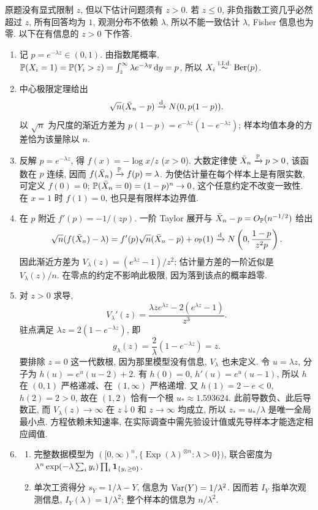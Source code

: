 \begin{solution}
原题没有显式限制 $z$, 但以下估计问题须有 $z>0$. 若 $z\le0$, 非负指数工资几乎必然超过 $z$, 所有回答均为 $1$, 观测分布不依赖 $\lambda$, 所以不能一致估计 $\lambda$, Fisher 信息也为零. 以下在有信息的 $z>0$ 下作答.
\begin{enumerate}[label=\arabic*.]
\item 记 $p=e^{-\lambda z}\in(0,1)$. 由指数尾概率,
$\mathbb P(X_i=1)=\mathbb P(Y_i>z)=\int_z^\infty\lambda e^{-\lambda y}\,\mathrm d y=p$,
所以 $X_i\stackrel{\mathrm{i.i.d.}}{\sim}\operatorname{Ber}(p)$.
\item 中心极限定理给出
\[
\sqrt n(\bar X_n-p)\xrightarrow{\mathrm d} N(0,p(1-p)).
\]
以 $\sqrt n$ 为尺度的渐近方差为 $p(1-p)=e^{-\lambda z}(1-e^{-\lambda z})$; 样本均值本身的方差恰为该量除以 $n$.
\item 反解 $p=e^{-\lambda z}$, 得 $f(x)=-\log x/z$ ($x>0$). 大数定律使 $\bar X_n\xrightarrow{\mathbb P} p>0$, 该函数在 $p$ 连续, 因而 $f(\bar X_n)\xrightarrow{\mathbb P} f(p)=\lambda$. 为使估计量在每个样本上是有限实数, 可定义 $f(0)=0$; $\mathbb P(\bar X_n=0)=(1-p)^n\to0$, 这个任意约定不改变一致性. 在 $x=1$ 时 $f(1)=0$, 也只是有限样本边界值.
\item 在 $p$ 附近 $f'(p)=-1/(zp)$. 一阶 Taylor 展开与 $\bar X_n-p=O_{\mathbb P}(n^{-1/2})$ 给出
\[
\sqrt n(f(\bar X_n)-\lambda)
=f'(p)\sqrt n(\bar X_n-p)+o_{\mathbb P}(1)
\xrightarrow{\mathrm d} N\left(0,\frac{1-p}{z^2p}\right).
\]
因此渐近方差为
$V_\lambda(z)=(e^{\lambda z}-1)/z^2$; 估计量方差的一阶近似是 $V_\lambda(z)/n$. 在零点的约定不影响此极限, 因为落到该点的概率趋零.
\item 对 $z>0$ 求导,
\[
V_\lambda'(z)=\frac{\lambda z e^{\lambda z}-2(e^{\lambda z}-1)}{z^3}.
\]
驻点满足 $\lambda z=2(1-e^{-\lambda z})$, 即
\[
g_\lambda(z)=\frac2\lambda(1-e^{-\lambda z})=z.
\]
要排除 $z=0$ 这一代数根, 因为那里模型没有信息, $V_\lambda$ 也未定义. 令 $u=\lambda z$, 分子为 $h(u)=e^u(u-2)+2$. 有 $h(0)=0$, $h'(u)=e^u(u-1)$, 所以 $h$ 在 $(0,1)$ 严格递减、在 $(1,\infty)$ 严格递增. 又 $h(1)=2-e<0$, $h(2)=2>0$, 故在 $(1,2)$ 恰有一个根 $u_*\approx1.593624$. 此前导数负、此后导数正, 而 $V_\lambda(z)\to\infty$ 在 $z\downarrow0$ 和 $z\to\infty$ 均成立, 所以 $z_*=u_*/\lambda$ 是唯一全局最小点. 方程依赖未知速率, 在实际调查中需先验设计值或先导样本才能选定相应阈值.
\item \begin{enumerate}[label=(\alph*)]
\item 完整数据模型为 $([0,\infty)^n,\{\operatorname{Exp}(\lambda)^{\otimes n}:\lambda>0\})$, 联合密度为 $\lambda^n\exp(-\lambda\sum_i y_i)\prod_i\mathbf 1_{\{y_i\ge0\}}$.
\item 单次工资得分 $s_Y=1/\lambda-Y$, 信息为 $\operatorname{Var}(Y)=1/\lambda^2$. 因而若 $I_Y$ 指单次观测信息, $I_Y(\lambda)=1/\lambda^2$; 整个样本的信息为 $n/\lambda^2$.

\end{enumerate}
\end{enumerate}
\end{solution}
